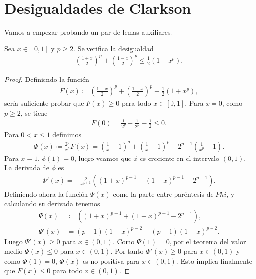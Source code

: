 \section{Desigualdades de Clarkson}

Vamos a empezar probando un par de lemas auxiliares.

\begin{lemma} \label{lema:clarkson-1}
    Sea $ x \in [0, 1] $ y $ p \geq 2 $. Se verifica la desigualdad
    \begin{align}
        \left( \frac{1+x}{2} \right)^p + \left( \frac{1-x}{2} \right)^p \leq \frac{1}{2} (1 + x^p).
    \end{align}
\end{lemma}
\begin{proof}
    Definiendo la función
    \begin{align}
        F(x) \coloneq \left( \frac{1+x}{2} \right)^p + \left( \frac{1-x}{2} \right)^p - \frac{1}{2} (1 + x^p),
    \end{align}
    sería suficiente probar que $ F(x) \geq 0 $ para todo $ x \in [0, 1] $. Para $ x = 0 $, como $ p \geq 2 $, se tiene 
    \begin{align}
        F(0) = \frac{1}{2^p} + \frac{1}{2^p} - \frac{1}{2} \leq 0.
    \end{align}
    Para $ 0 < x \leq 1 $ definimos
    \begin{align}
        \Phi(x) \coloneq \frac{2^p}{x^p} F(x) = \left( \frac{1}{x} + 1 \right)^p + \left( \frac{1}{x} - 1 \right)^p - 2^{p-1} \left( \frac{1}{x^p} + 1 \right).
    \end{align}
    Para $ x = 1 $, $ \phi(1) = 0 $, luego veamos que $ \phi $ es creciente en el intervalo $ (0, 1) $. La derivada de $ \phi $ es
    \begin{align}
        \Phi'(x) = -\frac{p}{x^{p+1}} \left( (1+x)^{p-1} + (1-x)^{p-1} - 2^{p-1} \right).
    \end{align}
    Definiendo ahora la función $ \Psi(x) $ como la parte entre paréntesis de $ Phi$, y calculando su derivada tenemos
    \begin{align}
        \Psi(x) &\coloneq \left( (1+x)^{p-1} + (1-x)^{p-1} - 2^{p-1} \right), \\
        \Psi'(x) &= (p-1)(1+x)^{p-2} - (p-1)(1-x)^{p-2}.
    \end{align}
    Luego $ \Psi'(x) \geq 0 $ para $ x \in (0, 1) $. Como $ \Psi(1) = 0 $, por el teorema del valor medio $ \Psi(x) \leq 0 $ para $ x \in (0, 1) $. Por tanto $ \Phi'(x) \geq 0 $ para $ x \in (0, 1) $ y como $ \Phi(1) = 0 $, $ \Phi(x) $ es no positiva para $ x \in (0, 1) $. Esto implica finalmente que $ F(x) \leq 0 $ para todo $ x \in (0, 1) $.
\end{proof}

